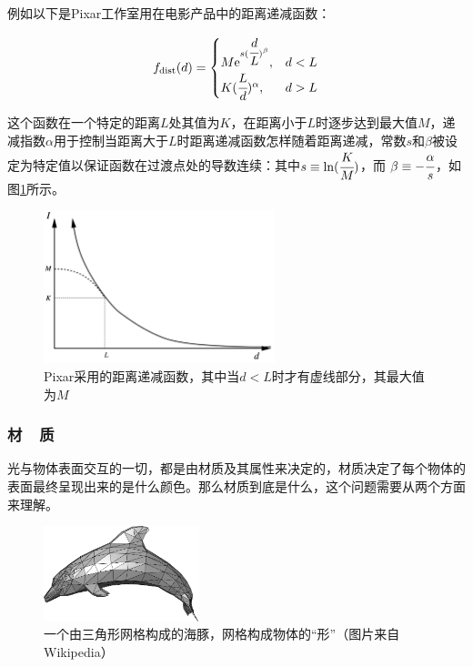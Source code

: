例如以下是Pixar工作室用在电影产品中的距离递减函数\cite{a:LightingControlsforComputerCinematography}：

\begin{equation}
	f_{\rm dist}(d)=\begin{cases}
		M{\rm e}^{s( \cfrac{d}{L})^{\beta}}, & d<L\\
		K( \cfrac{L}{d})^{\alpha}, &d>L
	\end{cases}
\end{equation}

\noindent 这个函数在一个特定的距离$L$处其值为$K$，在距离小于$L$时逐步达到最大值$M$，递减指数$\alpha$用于控制当距离大于$L$时距离递减函数怎样随着距离递减，常数$s$和$\beta$被设定为特定值以保证函数在过渡点处的导数连续：其中$s\equiv {\rm ln}( \cfrac{K}{M})$，而 $\beta\equiv - \cfrac{\alpha}{s}$，如图\ref{f:intro-falloff}所示。

\begin{figure}
\sidecaption
	\includegraphics[width=0.6\textwidth]{figures/intro/falloff}
	\caption{Pixar采用的距离递减函数，其中当$d<L$时才有虚线部分，其最大值为$M$}
	\label{f:intro-falloff}
\end{figure}




\subsubsection{材~~质}\label{sec:intro-materials}
光与物体表面交互的一切，都是由材质及其属性来决定的，材质决定了每个物体的表面最终呈现出来的是什么颜色。那么材质到底是什么，这个问题需要从两个方面来理解。

\begin{figure}
\sidecaption
	\includegraphics[width=0.4\textwidth]{figures/intro/mesh}
	\caption{一个由三角形网格构成的海豚，网格构成物体的“形”（图片来自Wikipedia）}
	\label{f:intro-mesh}
\end{figure}

